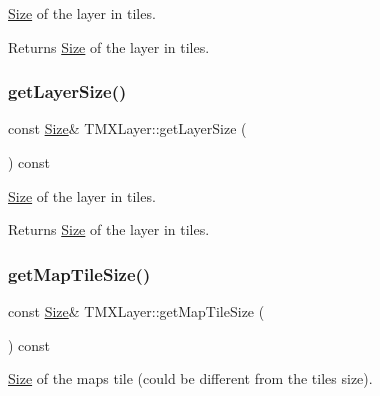 \hyperlink{classSize}{Size} of the layer in tiles.

\begin{DoxyReturn}{Returns}
\hyperlink{classSize}{Size} of the layer in tiles. 
\end{DoxyReturn}
\mbox{\label{classTMXLayer_a33aa146a907ade5080f67817ee8f552d}} 
\subsubsection{\texorpdfstring{get\+Layer\+Size()}{getLayerSize()}\hspace{0.1cm}{\footnotesize\ttfamily [2/2]}}
{\footnotesize\ttfamily const \hyperlink{classSize}{Size}\& T\+M\+X\+Layer\+::get\+Layer\+Size (\begin{DoxyParamCaption}{ }\end{DoxyParamCaption}) const\hspace{0.3cm}{\ttfamily [inline]}}

\hyperlink{classSize}{Size} of the layer in tiles.

\begin{DoxyReturn}{Returns}
\hyperlink{classSize}{Size} of the layer in tiles. 
\end{DoxyReturn}
\mbox{\label{classTMXLayer_acb38799b0ca66198f06c9b451b469118}} 
\subsubsection{\texorpdfstring{get\+Map\+Tile\+Size()}{getMapTileSize()}\hspace{0.1cm}{\footnotesize\ttfamily [1/2]}}
{\footnotesize\ttfamily const \hyperlink{classSize}{Size}\& T\+M\+X\+Layer\+::get\+Map\+Tile\+Size (\begin{DoxyParamCaption}{ }\end{DoxyParamCaption}) const\hspace{0.3cm}{\ttfamily [inline]}}

\hyperlink{classSize}{Size} of the map\textquotesingle{}s tile (could be different from the tile\textquotesingle{}s size).

